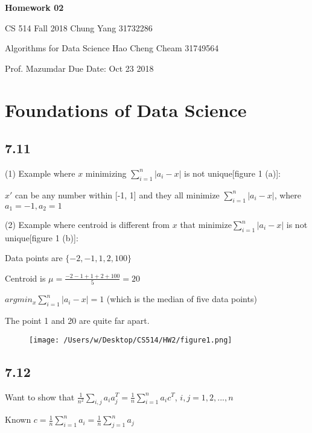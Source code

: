 \documentclass[a4paper, 11pt]{article}
\begin{document}
\noindent \large\textbf{Homework 02}

\normalsize CS 514 Fall 2018 \hfill Chung Yang 31732286

Algorithms for Data Science \hfill Hao Cheng Cheam 31749564



Prof. Mazumdar \hfill Due Date: Oct 23 2018 \\

\section*{Foundations of Data Science}

\subsection*{7.11}

(1) Example where $x$ minimizing $\sum_{i=1}^n |a_i - x|$ is not unique[figure 1 (a)]:


$x'$ can be any number within [-1, 1] and they all minimize $\sum_{i=1}^n |a_i - x|$, where $a_1 = -1, a_2 = 1$

(2) Example where centroid is different from $x$ that minimize$\sum_{i=1}^n |a_i - x|$ is not unique[figure 1 (b)]:

Data points are $\{-2, -1, 1, 2, 100 \}$

Centroid is $\mu = \frac{-2-1+1+2+100}{5} = 20$

$argmin_x  \sum_{i=1}^n |a_i - x| = 1$ (which is the median of five data points)

The point 1 and 20 are quite far apart.


\begin{figure}[htbp]
	\centering
	\texttt{[image: /Users/w/Desktop/CS514/HW2/figure1.png]}
\end{figure}

\subsection*{7.12}

Want to show that $\frac{1}{n^2} \sum_{i,j} a_i a_j^T = \frac{1}{n} \sum_{i=1}^n a_i c^T$, $i,j = 1, 2, ..., n$

Known $c = \frac{1}{n} \sum_{i = 1}^n a_i = \frac{1}{n} \sum_{j = 1}^n a_j$
\end{document}
